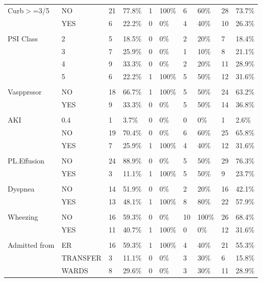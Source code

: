 \documentclass{article}\usepackage[]{graphicx}\usepackage[]{color}
\begin{document}
\begin{table}[ht]
\begin{tabular}{llllllllll}
  Curb$>$=3/5 & NO & 21 & 77.8\% & 1 & 100\% & 6 & 60\% & 28 & 73.7\% \\ 
   & YES & 6 & 22.2\% & 0 & 0\% & 4 & 40\% & 10 & 26.3\% \\ 
   &  &  &  &  &  &  &  &  &  \\ 
  PSI Class & 2 & 5 & 18.5\% & 0 & 0\% & 2 & 20\% & 7 & 18.4\% \\ 
   & 3 & 7 & 25.9\% & 0 & 0\% & 1 & 10\% & 8 & 21.1\% \\ 
   & 4 & 9 & 33.3\% & 0 & 0\% & 2 & 20\% & 11 & 28.9\% \\ 
   & 5 & 6 & 22.2\% & 1 & 100\% & 5 & 50\% & 12 & 31.6\% \\ 
   &  &  &  &  &  &  &  &  &  \\ 
  Vaspprssor & NO & 18 & 66.7\% & 1 & 100\% & 5 & 50\% & 24 & 63.2\% \\ 
   & YES & 9 & 33.3\% & 0 & 0\% & 5 & 50\% & 14 & 36.8\% \\ 
   &  &  &  &  &  &  &  &  &  \\ 
  AKI & 0.4 & 1 & 3.7\% & 0 & 0\% & 0 & 0\% & 1 & 2.6\% \\ 
   & NO & 19 & 70.4\% & 0 & 0\% & 6 & 60\% & 25 & 65.8\% \\ 
   & YES & 7 & 25.9\% & 1 & 100\% & 4 & 40\% & 12 & 31.6\% \\ 
   &  &  &  &  &  &  &  &  &  \\ 
  PL.Effusion & NO & 24 & 88.9\% & 0 & 0\% & 5 & 50\% & 29 & 76.3\% \\ 
   & YES & 3 & 11.1\% & 1 & 100\% & 5 & 50\% & 9 & 23.7\% \\ 
   &  &  &  &  &  &  &  &  &  \\ 
  Dyspnea & NO & 14 & 51.9\% & 0 & 0\% & 2 & 20\% & 16 & 42.1\% \\ 
   & YES & 13 & 48.1\% & 1 & 100\% & 8 & 80\% & 22 & 57.9\% \\ 
   &  &  &  &  &  &  &  &  &  \\ 
  Wheezing & NO & 16 & 59.3\% & 0 & 0\% & 10 & 100\% & 26 & 68.4\% \\ 
   & YES & 11 & 40.7\% & 1 & 100\% & 0 & 0\% & 12 & 31.6\% \\ 
   &  &  &  &  &  &  &  &  &  \\ 
  Admitted from & ER & 16 & 59.3\% & 1 & 100\% & 4 & 40\% & 21 & 55.3\% \\ 
   & TRANSFER & 3 & 11.1\% & 0 & 0\% & 3 & 30\% & 6 & 15.8\% \\ 
   & WARDS & 8 & 29.6\% & 0 & 0\% & 3 & 30\% & 11 & 28.9\% \\ 

\end{tabular}
\end{table}
\end{document}
